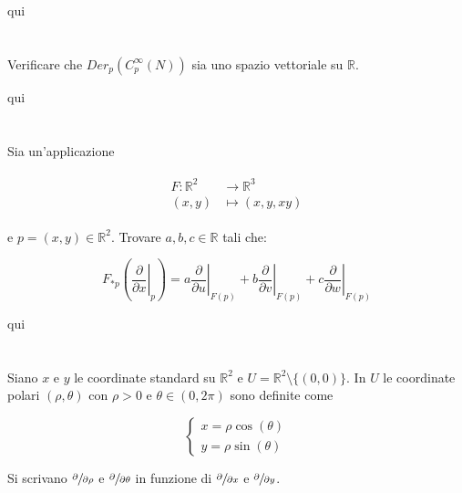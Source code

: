 qui

\tocless\section{}\label{BONUS2-2}

\begin{tcolorbox}
	Verificare che $ Der_{p}(C_{p}^{\infty}(N)) $ sia uno spazio vettoriale su $ \mathbb{R} $.
\end{tcolorbox}

qui

\tocless\section{}\label{es2-8}

\begin{tcolorbox}
	Sia un'applicazione
	
	\begin{align}
		\begin{split}
			F : \mathbb{R}^{2} &\to \mathbb{R}^{3}\\
			(x,y) &\mapsto (x,y,xy)
		\end{split}
	\end{align}
	
	e $ p = (x,y) \in \mathbb{R}^{2} $. Trovare $ a,b,c \in \mathbb{R} $ tali che:
	
	\begin{equation}
		F_{*p} \left( \left. \dfrac{\partial}{\partial x} \right|_{p} \right) = a \left. \dfrac{\partial}{\partial u} \right|_{F(p)} + b \left. \dfrac{\partial}{\partial v} \right|_{F(p)} + c \left. \dfrac{\partial}{\partial w} \right|_{F(p)}
	\end{equation}
\end{tcolorbox}

qui

\tocless\section{}\label{es2-9}

\begin{tcolorbox}
	Siano $ x $ e $ y $ le coordinate standard su $ \mathbb{R}^{2} $ e $ U = \mathbb{R}^{2} \setminus \{(0,0)\} $. In $ U $ le coordinate polari $ (\rho, \theta) $ con $ \rho > 0 $ e $ \theta \in (0,2\pi) $ sono definite come
	
	\begin{equation}
		\begin{cases}
			x = \rho \cos(\theta)\\
			y = \rho \sin(\theta)
		\end{cases}
	\end{equation}
	
	Si scrivano $ \sfrac{\partial}{\partial \rho} $ e $ \sfrac{\partial}{\partial \theta} $ in funzione di $ \sfrac{\partial}{\partial x} $ e $ \sfrac{\partial}{\partial y} $.
\end{tcolorbox}

